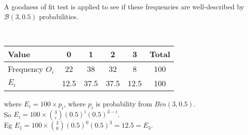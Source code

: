 \documentclass[bigtut]{tutorial}\usepackage[]{graphicx}\usepackage[]{color}
\begin{document}
\begin{tutorial}
\begin{questions}
\vspace{.5cm}
A goodness of fit test is applied to see if these frequencies are
well-described by $\mathcal B(3,0.5)$ probabilities.  \\



\begin{solution}
 \\


\begin{tabular}[ ]{|l||c|c|c|c| c|}\hline
Value & 0 & 1 & 2 & 3 & Total  \\\hline Frequency $O_{i}$ & 22 & 38 & 32 & 8 & 100 \\ \hline
$E_{i}$ & 12.5 &  37.5 & 37.5 & 12.5  &  100 \\ \hline
\end{tabular}

where $E_{i} = 100 \times p_{i}$, where $p_{i}$ is probability from $Bin(3,0.5)$. \\
So $E_{i} = 100 \times {3 \choose i} (0.5)^i (0.5)^{3-i}$. \\
Eg $E_{1} = 100 \times {3 \choose 0} (0.5)^0 (0.5)^{3} = 12.5= E_{3}$. \\


\end{solution}
\end{questions}
\end{tutorial}
\end{document}
